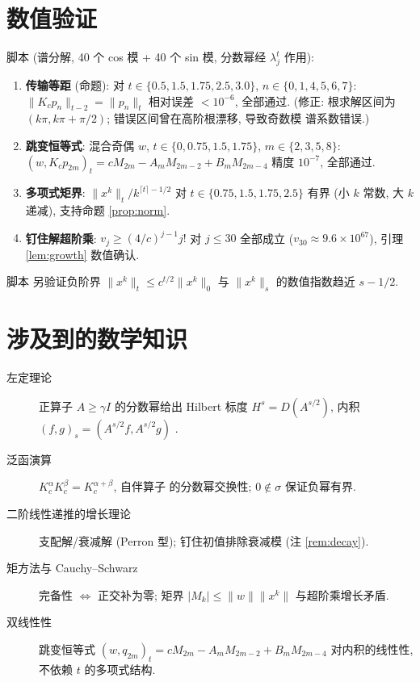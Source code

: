 \documentclass[UTF8]{ctexart}
\begin{document}
\section{数值验证}

脚本  (谱分解, 40 个 cos 模 + 40 个
sin 模, 分数幂经 $\lambda_j^t$ 作用):
\begin{enumerate}
	\item \textbf{传输等距} (命题): 对 $t \in \{0.5, 1.5, 1.75, 2.5, 3.0\}$,
		$n \in \{0,1,4,5,6,7\}$: $\|K_c p_n\|_{t-2} = \|p_n\|_t$
		相对误差 $< 10^{-6}$, 全部通过. (修正: 根求解区间为
		$(k\pi, k\pi+\pi/2)$; 错误区间曾在高阶根漂移, 导致奇数模
		谱系数错误.)
	\item \textbf{跳变恒等式}: 混合奇偶 $w$, $t \in \{0, 0.75, 1.5, 1.75\}$,
		$m \in \{2,3,5,8\}$: $(w, K_c p_{2m})_t = cM_{2m} - A_mM_{2m-2}
		+ B_mM_{2m-4}$ 精度 $10^{-7}$, 全部通过.
	\item \textbf{多项式矩界}: $\|x^k\|_t / k^{\lceil t\rceil-1/2}$
		对 $t \in \{0.75, 1.5, 1.75, 2.5\}$ 有界 (小 $k$ 常数, 大 $k$ 递减),
		支持命题 \ref{prop:norm}.
	\item \textbf{钉住解超阶乘}: $v_j \ge (4/c)^{j-1}j!$ 对 $j \le 30$
		全部成立 ($v_{30} \approx 9.6 \times 10^{67}$), 引理
		\ref{lem:growth} 数值确认.
\end{enumerate}

脚本  另验证负阶界
$\|x^k\|_t \le c^{t/2}\|x^k\|_0$ 与 $\|x^k\|_s$ 的数值指数趋近 $s-1/2$.

\section{涉及到的数学知识}

\begin{description}
	\item[左定理论] 正算子 $A \ge \gamma I$ 的分数幂给出 Hilbert 标度
		$H^s = D(A^{s/2})$, 内积 $(f,g)_s = (A^{s/2}f, A^{s/2}g)$ \cite{lw1,fg}.
	\item[泛函演算] $K_c^\alpha K_c^\beta = K_c^{\alpha+\beta}$, 自伴算子
		的分数幂交换性; $0 \notin \sigma$ 保证负幂有界.
	\item[二阶线性递推的增长理论] 支配解/衰减解 (Perron 型);
		钉住初值排除衰减模 (注 \ref{rem:decay}).
	\item[矩方法与 Cauchy--Schwarz] 完备性 $\iff$ 正交补为零;
		矩界 $|M_k| \le \|w\|\|x^k\|$ 与超阶乘增长矛盾.
	\item[双线性性] 跳变恒等式 $(w, q_{2m})_t = cM_{2m} - A_mM_{2m-2}
		+ B_mM_{2m-4}$ 对内积的线性性, 不依赖 $t$ 的多项式结构.
\end{description}
\end{document}
